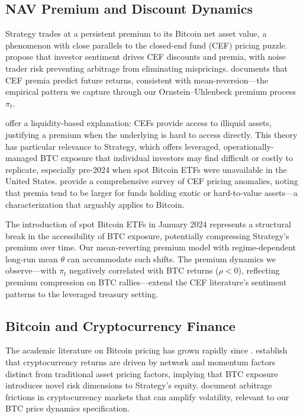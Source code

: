 \subsection{NAV Premium and Discount Dynamics}

Strategy trades at a persistent premium to its Bitcoin net asset value, a phenomenon with close parallels to the closed-end fund (CEF) pricing puzzle.
\citet{lee1991investor} propose that investor sentiment drives CEF discounts and premia, with noise trader risk preventing arbitrage from eliminating mispricings.
\citet{pontiff1995closed} documents that CEF premia predict future returns, consistent with mean-reversion---the empirical pattern we capture through our Ornstein--Uhlenbeck premium process $\pi_t$.

\citet{cherkes2009closed} offer a liquidity-based explanation: CEFs provide access to illiquid assets, justifying a premium when the underlying is hard to access directly.
This theory has particular relevance to Strategy, which offers leveraged, operationally-managed BTC exposure that individual investors may find difficult or costly to replicate, especially pre-2024 when spot Bitcoin ETFs were unavailable in the United States.
\citet{dimson1999closed} provide a comprehensive survey of CEF pricing anomalies, noting that premia tend to be larger for funds holding exotic or hard-to-value assets---a characterization that arguably applies to Bitcoin.

The introduction of spot Bitcoin ETFs in January 2024 \citep{alexander2024bitcoin} represents a structural break in the accessibility of BTC exposure, potentially compressing Strategy's premium over time.
Our mean-reverting premium model with regime-dependent long-run mean $\theta$ can accommodate such shifts.
The premium dynamics we observe---with $\pi_t$ negatively correlated with BTC returns ($\rho < 0$), reflecting premium compression on BTC rallies---extend the CEF literature's sentiment patterns to the leveraged treasury setting.

\subsection{Bitcoin and Cryptocurrency Finance}

The academic literature on Bitcoin pricing has grown rapidly since \citet{nakamoto2008bitcoin}.
\citet{liu2021risks} establish that cryptocurrency returns are driven by network and momentum factors distinct from traditional asset pricing factors, implying that BTC exposure introduces novel risk dimensions to Strategy's equity.
\citet{makarov2020trading} document arbitrage frictions in cryptocurrency markets that can amplify volatility, relevant to our BTC price dynamics specification.

